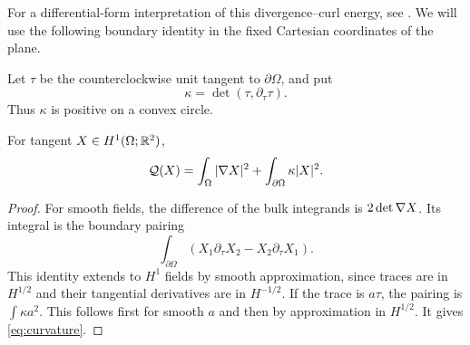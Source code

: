 For a differential-form interpretation of this divergence--curl energy, see \cite[Section~5.1]{FriesGoffengMiranda2026}. We will use the following boundary identity in the fixed Cartesian coordinates of the plane.

Let $\tau$ be the counterclockwise unit tangent to $\partial\Omega$, and put
\[
\kappa=\det(\tau,\partial_\tau\tau).
\]
Thus $\kappa$ is positive on a convex circle.

\begin{lemma}\label{lem:curvature}
For tangent $X\in H^1(\Omega;\mathbb R^2)$,
\begin{equation}\label{eq:curvature}
\mathcal Q(X)=\int_\Omega|\nabla X|^2
+\int_{\partial\Omega}\kappa|X|^2.
\end{equation}
\end{lemma}
\begin{proof}
For smooth fields, the difference of the bulk integrands is $2\det\nabla X$. Its integral is the boundary pairing
\[
\int_{\partial\Omega}
(X_1\partial_\tau X_2-X_2\partial_\tau X_1).
\]
This identity extends to $H^1$ fields by smooth approximation, since traces are in $H^{1/2}$ and their tangential derivatives are in $H^{-1/2}$. If the trace is $a\tau$, the pairing is $\int\kappa a^2$. This follows first for smooth $a$ and then by approximation in $H^{1/2}$. It gives \eqref{eq:curvature}.
\end{proof}
